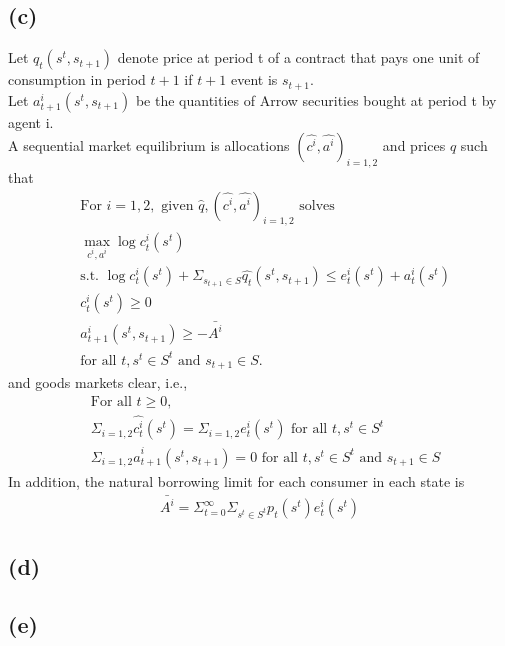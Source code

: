 \documentclass[a4paper]{article}
\begin{document}
\subsection*{(c)}
Let $q_t(s^t, s_{t+1})$ denote price at period t of a contract that pays one unit of consumption in period $t+1$ if $t+1$ event is $s_{t+1}$.\\
Let $a_{t+1}^i(s^t, s_{t+1})$ be the quantities of Arrow securities bought at period t by agent i.\\
A sequential market equilibrium is allocations $(\hat{c^i}, \hat{a^i})_{i = 1, 2}$ and prices $\hat{q}$ such that
\begin{align*}
    & \text{For }i = 1, 2, \text{ given }\hat{q}, (\hat{c^i}, \hat{a^i})_{i = 1, 2} \text{ solves}\\
    & \max_{c^i, a^i} \log c^i_t(s^t)\\
    & \text{s.t. }\log c_t^i(s^t) + \Sigma_{s_{t+1} \in S} \hat{q_t}(s^t, s_{t+1}) \leq e_t^i(s^t) + a_t^i(s^t)\\
    & c_t^i(s^t) \geq 0\\
    & a_{t+1}^i(s^t, s_{t+1}) \geq - \bar{A^i}\\
    & \text{for all }t, s^t \in S^t \text{ and }s_{t+1} \in S.
\end{align*}
and goods markets clear, i.e.,
\begin{align*}
    & \text{For all }t \geq 0,\\
    & \Sigma_{i = 1, 2} \hat{c_t^i}(s^t) = \Sigma_{i = 1, 2} e_t^i(s^t) \text{ for all }t, s^t \in S^t\\
    & \Sigma_{i = 1, 2} \hat{a}_{t+1}^i (s^t, s_{t+1}) = 0 \text{ for all }t, s^t \in S^t \text{ and }s_{t+1} \in S
\end{align*}
In addition, the natural borrowing limit for each consumer in each state is
\begin{align*}
    \bar{A^i} = \Sigma_{t=0}^\infty \Sigma_{s^t \in S^t} p_t(s^t) e_t^i(s^t)
\end{align*}

\subsection*{(d)}

\subsection*{(e)}

\section{} %
\end{document}
